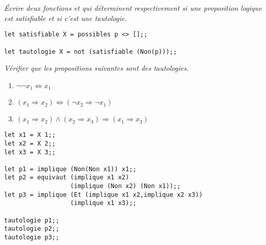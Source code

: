 \begin{Exercise}\it 
Écrire deux fonctions  et  qui déterminent respectivement si une proposition logique est satisfiable et si c’est une tautologie.
\end{Exercise}
\begin{Answer}
\begin{lstlisting}
let satisfiable X = possibles p <> [];;

let tautologie X = not (satisfiable (Non(p)));;
\end{lstlisting}
\end{Answer}
\begin{Exercise}\it
Vérifier que les propositions suivantes sont des tautologies.
\begin{enumerate}
  \item $\lnot \lnot x_1 \Leftrightarrow x_1$
  \item $(x_1 \Rightarrow x_2)\Leftrightarrow(\lnot x_2 \Rightarrow \lnot x_1)$
  \item $(x_1 \Rightarrow x_2) \land (x_2 \Rightarrow x_3) \Rightarrow (x_1 \Rightarrow x_3)$
\end{enumerate}
\end{Exercise}
\begin{Answer}
\begin{lstlisting}
let x1 = X 1;;
let x2 = X 2;;
let x3 = X 3;;

let p1 = implique (Non(Non x1)) x1;;
let p2 = equivaut (implique x1 x2) 
                  (implique (Non x2) (Non x1));;
let p3 = implique (Et (implique x1 x2,implique x2 x3)) 
                  (implique x1 x3);;

tautologie p1;;
tautologie p2;;
tautologie p3;;
\end{lstlisting}
\newpage
\end{Answer}
\newpage
